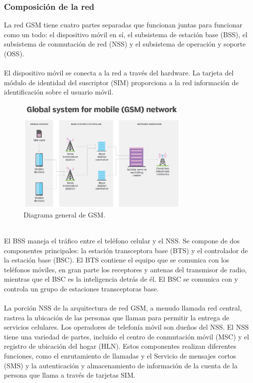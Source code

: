 \documentclass[11pt,letterpaper]{article}
\begin{document}
\subsubsection{Composición de la red}
La red GSM tiene cuatro partes separadas que funcionan juntas para funcionar como un todo: 
el dispositivo móvil en sí, el subsistema de estación base (BSS), el subsistema de 
conmutación de red (NSS) y el subsistema de operación y soporte (OSS).
\\ \\
El dispositivo móvil se conecta a la red a través del hardware. La tarjeta del módulo de 
identidad del suscriptor (SIM) proporciona a la red información de identificación sobre 
el usuario móvil.
\begin{figure}[ht]
    \centering
    \includegraphics[width=0.75\textwidth]{imagenes/t30.png}
    \caption{Diagrama general de GSM.}
\end{figure}
\\
El BSS maneja el tráfico entre el teléfono celular y el NSS. Se compone de dos componentes 
principales: la estación transceptora base (BTS) y el controlador de la estación base (BSC). 
El BTS contiene el equipo que se comunica con los teléfonos móviles, en gran parte los 
receptores y antenas del transmisor de radio, mientras que el BSC es la inteligencia 
detrás de él. El BSC se comunica con y controla un grupo de estaciones transceptoras base.
\\ \\
La porción NSS de la arquitectura de red GSM, a menudo llamada red central, rastrea la 
ubicación de las personas que llaman para permitir la entrega de servicios celulares. 
Los operadores de telefonía móvil son dueños del NSS. El NSS tiene una variedad de partes, 
incluido el centro de conmutación móvil (MSC) y el registro de ubicación del hogar (HLN). 
Estos componentes realizan diferentes funciones, como el enrutamiento de llamadas y el 
Servicio de mensajes cortos (SMS) y la autenticación y almacenamiento de información de 
la cuenta de la persona que llama a través de tarjetas SIM.
\end{document}
